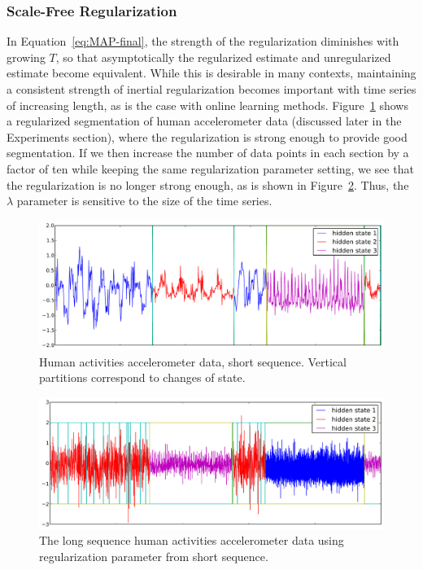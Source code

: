 \documentclass[letterpaper]{article}
\begin{document}
\subsubsection{Scale-Free Regularization}

In Equation~\ref{eq:MAP-final}, the strength of the regularization diminishes
with growing $T$, so that asymptotically the regularized estimate and
unregularized estimate become equivalent. While this is desirable in many
contexts, maintaining a consistent strength of inertial regularization becomes
important with time series of increasing length, as is the case with online
learning methods. Figure~\ref{fig:short-real-data} shows a regularized
segmentation of human accelerometer data (discussed later in the Experiments
section), where the regularization is strong enough to provide good segmentation. If we 
then increase the number of data points in each section by a factor of ten while keeping 
the same regularization parameter setting, we see that the regularization is no longer 
strong enough, as is shown in Figure~\ref{fig:long-real-data}. Thus, the $\lambda$ parameter is
sensitive to the size of the time series.

\begin{figure}[htbp]
\setlength{\abovecaptionskip}{0pt}
\setlength{\belowcaptionskip}{0cm}
  \centering
    \includegraphics[width=1.\linewidth]{images/MAP_results_hard_activity_short_3_states.pdf}
  \caption{\small{Human activities accelerometer data, short sequence. Vertical
  partitions correspond to changes of state.}}
  \label{fig:short-real-data}  
\end{figure}
\begin{figure}[htbp]
\setlength{\abovecaptionskip}{0pt}
\setlength{\belowcaptionskip}{0cm}
  \centering
    \includegraphics[width=1.\linewidth]{images/MAP_results_hard_activity_long_3_states.png}    
  \caption{\small{The long sequence human activities accelerometer data using
  regularization parameter from short sequence.}}
  \label{fig:long-real-data}
\end{figure}
\end{document}
